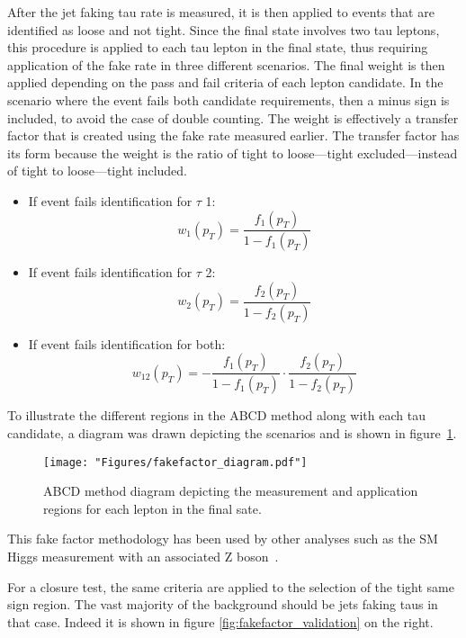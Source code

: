 After the jet faking tau rate is measured, it is then applied to events that are identified as loose and not tight. Since the final state involves two tau leptons, this procedure is applied to each tau lepton in the final state, thus requiring application of the fake rate in three different scenarios. The final weight is then applied depending on the pass and fail criteria of each lepton candidate. In the scenario where the event fails both candidate requirements, then a minus sign is included, to avoid the case of double counting.  
 The weight is effectively a transfer factor that is created using the fake rate measured earlier. The transfer factor has its form because the weight is the ratio of tight to loose---tight excluded---instead of tight to loose---tight included. 
\begin{itemize}
\item{If event fails identification for $\tau$ 1:\begin{equation}\label{eq:frw} w_1(p_T)=\frac{f_{1}(p_T)}{1-f_{1}(p_T)}\end{equation}}
\item{If event fails identification for $\tau$ 2:\begin{equation}w_2(p_T)=\frac{f_{2}(p_T)}{1-f_{2}(p_T)}\end{equation}}
\item{If event fails identification for both:\begin{equation}w_{12}(p_T)=-\frac{f_{1}(p_T)}{1-f_{1}(p_T)}\cdot\frac{f_{2}(p_T)}{1-f_{2}(p_T)}\end{equation}}
\end{itemize}

To illustrate the different regions in the ABCD method along with each tau candidate, a diagram was drawn depicting the scenarios and is shown in figure~\ref{fig:fakefactor_reg}. 
\begin{figure}[ht!b]
\label{fig:fakefactor_reg}
  \texttt{[image: "Figures/fakefactor\_diagram.pdf"]}
    \caption{ ABCD method diagram depicting the measurement and application regions for each \tauh lepton in the final sate.}
\end{figure}

This fake factor methodology has been used by other analyses such as the SM Higgs measurement with an associated Z boson~\cite{CMS-PAS-HIG-19-010}. 

For a closure test, the same criteria are applied to the selection of the tight same sign region. The vast majority of the background should be jets faking taus in that case. Indeed it is shown in figure \ref{fig:fakefactor_validation} on the right.


